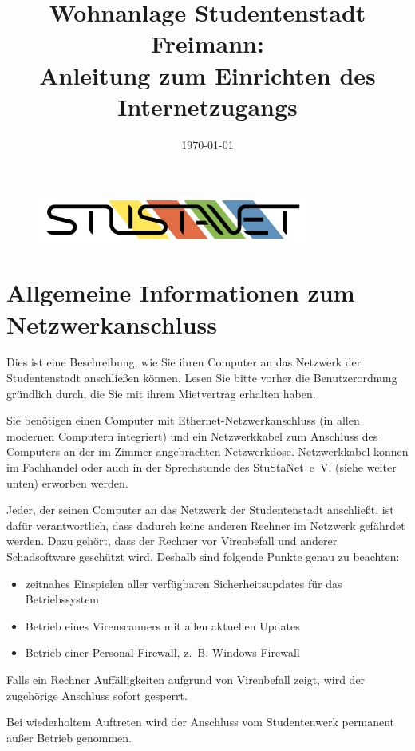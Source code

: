 \documentclass[a4paper,12pt]{scrartcl}
\title{Wohnanlage Studentenstadt Freimann:\\
       Anleitung zum Einrichten des Internetzugangs}
\date{\today}
\begin{document}
\maketitle

\begin{figure}[t!]
   \centering
   \vspace{-20pt}
   \includegraphics[width=0.8\textwidth,keepaspectratio]{Bilder/StuStaNet_Logo}
   \vspace{-20pt}
\end{figure}

\section*{Allgemeine Informationen zum Netzwerkanschluss}

Dies ist eine Beschreibung, wie Sie ihren Computer an das Netzwerk der Studentenstadt anschließen können. Lesen Sie bitte vorher die Benutzerordnung gründlich durch, die Sie mit ihrem Mietvertrag erhalten haben.

Sie benötigen einen Computer mit Ethernet-Netzwerkanschluss (in allen modernen Computern integriert) und ein Netzwerkkabel zum Anschluss des Computers an der im Zimmer angebrachten Netzwerkdose. Netzwerkkabel können im Fachhandel oder auch in der Sprechstunde des StuStaNet~e~V. (siehe weiter unten) erworben werden.

Jeder, der seinen Computer an das Netzwerk der Studentenstadt anschließt, ist dafür verantwortlich, dass dadurch keine anderen Rechner im Netzwerk gefährdet werden. Dazu gehört, dass der Rechner vor Virenbefall und anderer Schadsoftware geschützt wird. Deshalb sind folgende Punkte genau zu beachten:
\begin{itemize}
    \item zeitnahes Einspielen aller verfügbaren Sicherheitsupdates für das Betriebssystem
    \item Betrieb eines Virenscanners mit allen aktuellen Updates
    \item Betrieb einer Personal Firewall, z.~B. Windows Firewall
\end{itemize}
Falls ein Rechner Auffälligkeiten aufgrund von Virenbefall zeigt, wird der zugehörige Anschluss sofort gesperrt.

\begin{em}
Bei wiederholtem Auftreten wird der Anschluss vom Studentenwerk permanent außer Betrieb genommen.
\end{em}
\end{document}
